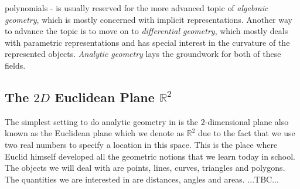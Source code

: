 polynomials - is usually reserved for the more advanced topic of \emph{algebraic geometry}, which is mostly concerned with implicit representations. Another way to advance the topic is to move on to \emph{differential geometry}, which mostly deals with parametric representations and has special interest in the curvature of the represented objects. \emph{Analytic geometry} lays the groundwork for both of these fields. 



%


\subsection{The $2D$ Euclidean Plane $\mathbb{R}^2$}
The simplest setting to do analytic geometry in is the $2$-dimensional plane also known as the Euclidean plane which we denote as $\mathbb{R}^2$ due to the fact that we use two real numbers to specify a location in this space. This is the place where Euclid himself developed all the geometric notions that we learn today in school. The objects we will deal with are points, lines, curves, triangles and polygons. The quantities we are interested in are distances, angles and areas. ...TBC...

